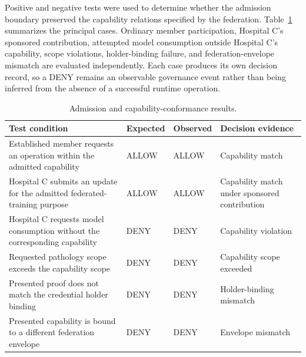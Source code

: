 \documentclass[twoside,11pt]{article}
\begin{document}
Positive and negative tests were used to determine whether the admission boundary preserved the capability relations specified by the federation. Table~\ref{tab:admission-results} summarizes the principal cases. Ordinary member participation, Hospital C's sponsored contribution, attempted model consumption outside Hospital C's capability, scope violations, holder-binding failure, and federation-envelope mismatch are evaluated independently. Each case produces its own decision record, so a DENY remains an observable governance event rather than being inferred from the absence of a successful runtime operation.

\begin{table}[htbp]
\centering
\caption{Admission and capability-conformance results.}
\label{tab:admission-results}
\small
\begin{tabularx}{\textwidth}{
    >{\raggedright\arraybackslash}p{5.0cm}
    >{\centering\arraybackslash}p{1.7cm}
    >{\centering\arraybackslash}p{1.8cm}
    >{\raggedright\arraybackslash}X
}
\toprule
\textbf{Test condition} &
\textbf{Expected} &
\textbf{Observed} &
\textbf{Decision evidence} \\
\midrule

Established member requests an operation within the admitted capability
&
ALLOW
&
ALLOW
&
Capability match
\\

\addlinespace

Hospital C submits an update for the admitted federated-training purpose
&
ALLOW
&
ALLOW
&
Capability match under sponsored contribution
\\

\addlinespace

Hospital C requests model consumption without the corresponding capability
&
DENY
&
DENY
&
Capability violation
\\

\addlinespace

Requested pathology scope exceeds the capability scope
&
DENY
&
DENY
&
Capability scope exceeded
\\

\addlinespace

Presented proof does not match the credential holder binding
&
DENY
&
DENY
&
Holder-binding mismatch
\\

\addlinespace

Presented capability is bound to a different federation envelope
&
DENY
&
DENY
&
Envelope mismatch
\\

\bottomrule
\end{tabularx}
\end{table}
\end{document}
